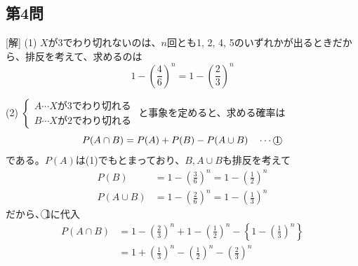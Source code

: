 \documentclass[../main.tex]{subfiles}
\begin{document}
\subsection*{第4問}
[解] (1) $X$が3でわり切れないのは、$n$回とも1, 2, 4, 5のいずれかが出るときだから、排反を考えて、求めるのは
\begin{equation*}
  1 - \left(\frac{4}{6}\right)^n = 1 - \left(\frac{2}{3}\right)^n
\end{equation*}

(2)
$
\begin{cases}
  A \cdots Xが3でわり切れる \\
  B \cdots Xが2でわり切れる
\end{cases}$ と事象を定めると、求める確率は
\begin{equation*}
  P(A \cap B) = P(A) + P(B) - P(A \cup B) \quad \cdots \text{\textcircled{1}}
\end{equation*}
である。$P(A)$は(1)でもとまっており、$B, A \cup B$も排反を考えて
\begin{align*}
  P(B) &= 1 - \left(\frac{3}{6}\right)^n = 1 - \left(\frac{1}{2}\right)^n \\
  P(A \cup B) &= 1 - \left(\frac{2}{6}\right)^n = 1 - \left(\frac{1}{3}\right)^n
\end{align*}
だから、\textcircled{1}に代入
\begin{align*}
  P(A \cap B) &= 1 - \left(\frac{2}{3}\right)^n + 1 - \left(\frac{1}{2}\right)^n - \left\{1 - \left(\frac{1}{3}\right)^n\right\} \\
  &= 1 + \left(\frac{1}{3}\right)^n - \left(\frac{1}{2}\right)^n - \left(\frac{2}{3}\right)^n
\end{align*}
\end{document}
